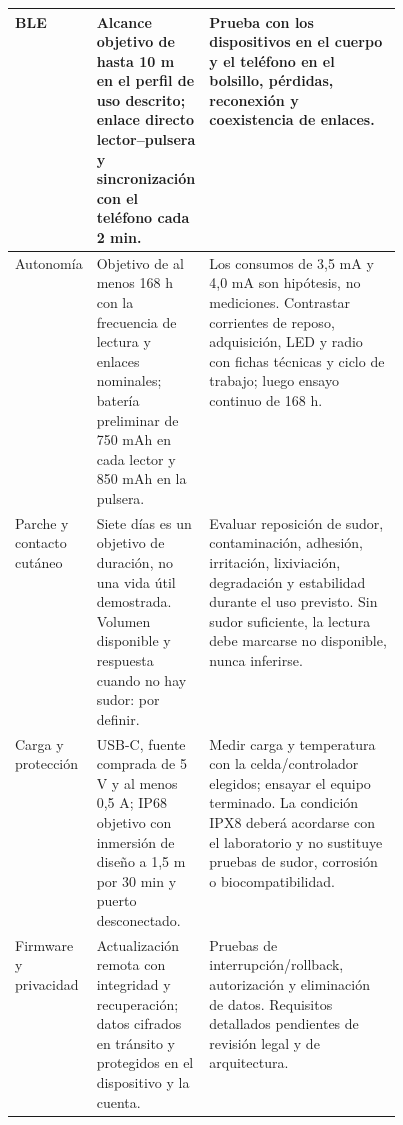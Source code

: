 {\begin{tabularx}{\linewidth}{|>{\raggedright\arraybackslash}p{0.20\linewidth}|>{\raggedright\arraybackslash}p{0.25\linewidth}|>{\raggedright\arraybackslash}X|}
BLE & Alcance objetivo de hasta 10 m en el perfil de uso descrito; enlace directo lector--pulsera y sincronización con el teléfono cada 2 min. & Prueba con los dispositivos en el cuerpo y el teléfono en el bolsillo, pérdidas, reconexión y coexistencia de enlaces.\\\hline
Autonomía & Objetivo de al menos 168 h con la frecuencia de lectura y enlaces nominales; batería preliminar de 750 mAh en cada lector y 850 mAh en la pulsera. & Los consumos de 3,5 mA y 4,0 mA son hipótesis, no mediciones. Contrastar corrientes de reposo, adquisición, LED y radio con fichas técnicas y ciclo de trabajo; luego ensayo continuo de 168 h.\\\hline
Parche y contacto cutáneo & Siete días es un objetivo de duración, no una vida útil demostrada. Volumen disponible y respuesta cuando no hay sudor: por definir. & Evaluar reposición de sudor, contaminación, adhesión, irritación, lixiviación, degradación y estabilidad durante el uso previsto. Sin sudor suficiente, la lectura debe marcarse no disponible, nunca inferirse.\\\hline
Carga y protección & USB-C, fuente comprada de 5 V y al menos 0,5 A; IP68 objetivo con inmersión de diseño a 1,5 m por 30 min y puerto desconectado. & Medir carga y temperatura con la celda/controlador elegidos; ensayar el equipo terminado. La condición IPX8 deberá acordarse con el laboratorio y no sustituye pruebas de sudor, corrosión o biocompatibilidad.\\\hline
Firmware y privacidad & Actualización remota con integridad y recuperación; datos cifrados en tránsito y protegidos en el dispositivo y la cuenta. & Pruebas de interrupción/rollback, autorización y eliminación de datos. Requisitos detallados pendientes de revisión legal y de arquitectura.\\\hline
\end{tabularx}}

